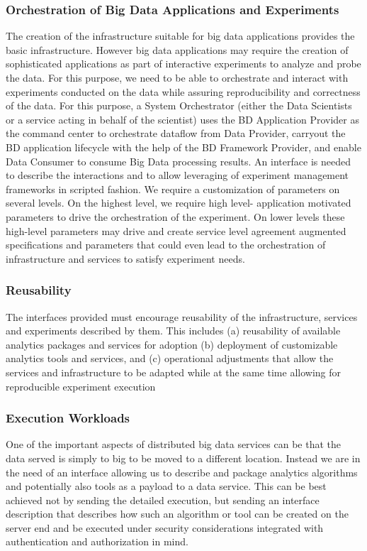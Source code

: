\documentclass[9pt,twocolumn]{styles/osajnl}
\begin{document}
\subsubsection{Orchestration of Big Data Applications and Experiments}

The creation of the infrastructure suitable for big data applications provides the basic infrastructure. However big data applications may require the creation of sophisticated applications as part of interactive experiments to analyze and probe the data. For this purpose, we need to be able to orchestrate and interact with experiments conducted on the data while assuring reproducibility and correctness of the data. For this purpose, a System Orchestrator (either the Data Scientists or a service acting in behalf of the scientist) uses the BD Application Provider as the command center to orchestrate dataflow from Data Provider, carryout the BD application lifecycle with the help of the BD Framework Provider, and enable Data Consumer to consume Big Data processing results. An interface is needed to describe the interactions and to allow leveraging of experiment management frameworks in scripted fashion. We require a customization of parameters on several levels. On the highest level, we require high level- application motivated parameters to drive the orchestration of the experiment. On lower levels these high-level parameters may drive and create service level agreement augmented specifications and parameters that could even lead to the orchestration of infrastructure and services to satisfy experiment needs.

\subsubsection{Reusability}

The interfaces provided must encourage reusability of the infrastructure, services and experiments described by them. This includes (a) reusability of available analytics packages and services for adoption (b) deployment of customizable analytics tools and services, and (c) operational adjustments that allow the services and infrastructure to be adapted while at the same time allowing for reproducible experiment execution

\subsubsection{Execution Workloads}

One of the important aspects of distributed big data services can be that the data served is simply to big to be moved to a different location. Instead we are in the need of an interface allowing us to describe and package analytics algorithms and potentially also tools as a payload to a data service. This can be best achieved not by sending the detailed execution, but sending an interface description that describes how such an algorithm or tool can be created on the server end and be executed under security considerations integrated with authentication and authorization in mind.
\end{document}
